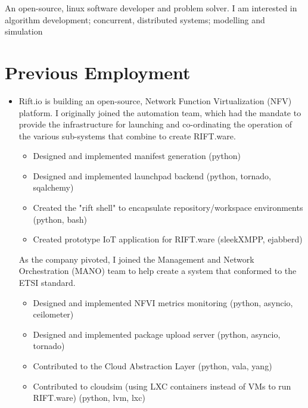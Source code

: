 \documentclass[11pt,a4paper,sans]{moderncv}        %
\begin{document}
\makecvtitle

\small{An open-source, linux software developer and problem solver. I am
interested in algorithm development; concurrent, distributed systems; modelling
and simulation}

\vspace{12pt}

\section{Previous Employment}

\vspace{6pt}

\begin{itemize}

\item{}

  Rift.io is building an open-source, Network Function Virtualization (NFV)
  platform. I originally joined the automation team, which had the mandate to
  provide the infrastructure for launching and co-ordinating the operation of
  the various sub-systems that combine to create RIFT.ware.

  \begin{itemize}
    \item{Designed and implemented manifest generation (python)}
    \item{Designed and implemented launchpad backend (python, tornado, sqalchemy)}
    \item{Created the "rift shell" to encapsulate repository/workspace environments (python, bash)}
    \item{Created prototype IoT application for RIFT.ware (sleekXMPP, ejabberd)}
  \end{itemize}

  As the company pivoted, I joined the Management and Network Orchestration
  (MANO) team to help create a system that conformed to the ETSI standard.

  \begin{itemize}
    \item{Designed and implemented NFVI metrics monitoring (python, asyncio, ceilometer)}
    \item{Designed and implemented package upload server (python, asyncio, tornado)}
    \item{Contributed to the Cloud Abstraction Layer (python, vala, yang)}
    \item{Contributed to cloudsim (using LXC containers instead of VMs to run RIFT.ware) (python, lvm, lxc)}
  \end{itemize}

\end{itemize}
\end{document}
